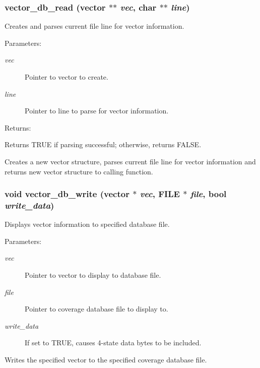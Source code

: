 \subsubsection{ vector\_\-db\_\-read ({\bf vector} $\ast$$\ast$ {\em vec}, char $\ast$$\ast$ {\em line})}\label{vector_8c_a12}


Creates and parses current file line for vector information.

\begin{Desc}
\item[Parameters: ]\par
\begin{description}
\item[{\em 
vec}]Pointer to vector to create. \item[{\em 
line}]Pointer to line to parse for vector information.\end{description}
\end{Desc}
\begin{Desc}
\item[Returns: ]\par
Returns TRUE if parsing successful; otherwise, returns FALSE.\end{Desc}
Creates a new vector structure, parses current file line for vector information and returns new vector structure to calling function. 
\subsubsection{\setlength{\rightskip}{0pt plus 5cm}void vector\_\-db\_\-write ({\bf vector} $\ast$ {\em vec}, FILE $\ast$ {\em file}, {\bf bool} {\em write\_\-data})}\label{vector_8c_a11}


Displays vector information to specified database file.

\begin{Desc}
\item[Parameters: ]\par
\begin{description}
\item[{\em 
vec}]Pointer to vector to display to database file. \item[{\em 
file}]Pointer to coverage database file to display to. \item[{\em 
write\_\-data}]If set to TRUE, causes 4-state data bytes to be included.\end{description}
\end{Desc}
Writes the specified vector to the specified coverage database file. 
